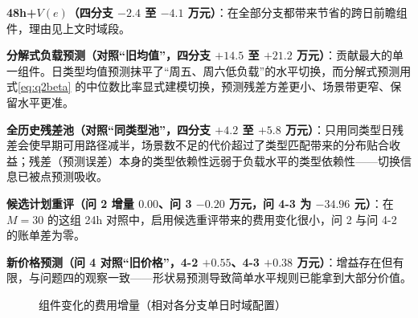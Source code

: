 \textbf{48h+$V(e)$（四分支 $-2.4$ 至 $-4.1$ 万元）}：在全部分支都带来节省的跨日前瞻组件，理由见上文时域段。

\textbf{分解式负载预测（对照“旧均值”，四分支 $+14.5$ 至 $+21.2$ 万元）}：贡献最大的单一组件。日类型均值预测抹平了“周五、周六低负载”的水平切换，而分解式预测用式\eqref{eq:q2beta} 的中位数比率显式建模切换，预测残差方差更小、场景带更窄、保留水平更准。

\textbf{全历史残差池（对照“同类型池”，四分支 $+4.2$ 至 $+5.8$ 万元）}：只用同类型日残差会使早期可用路径减半，场景数不足的代价超过了类型匹配带来的分布贴合收益；残差（预测误差）本身的类型依赖性远弱于负载水平的类型依赖性——切换信息已被点预测吸收。

\textbf{候选计划重评（问 2 增量 $0.00$、问 3 $-0.20$ 万元，问 4-3 为 $-34.96$ 元）}：在 $M=30$ 的这组 24h 对照中，启用候选重评带来的费用变化很小，问 2 与问 4-2 的账单差为零。

\textbf{新价格预测（问 4 对照“旧价格”，4-2 $+0.55$、4-3 $+0.38$ 万元）}：增益存在但有限，与问题四的观察一致——形状易预测导致简单水平规则已能拿到大部分价值。



\begin{figure}[H]\centering
{}
\caption{组件变化的费用增量（相对各分支单日时域配置）}\label{fig:fig_f18_components}
\end{figure}



